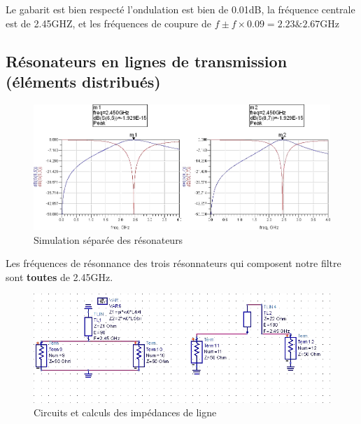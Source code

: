 \documentclass[10pt]{article}
\begin{document}
Le gabarit est bien respecté l’ondulation est bien de 0.01dB, la fréquence centrale est de 2.45GHZ,
et les fréquences de coupure de $f\pm f\times 0.09= 2.23 \& 2.67$GHz

\subsection{Résonateurs en lignes de transmission (éléments distribués)}

\begin{figure}
    \begin{center}
        \includegraphics[width=15cm]{p17_simu_resonateur}
    \end{center}
    \caption{Simulation séparée des résonateurs}
\end{figure}

Les fréquences de résonnance des trois résonnateurs qui composent notre filtre sont \textbf{toutes} de 2.45GHz.

\begin{figure}
    \begin{center}
        \includegraphics{p18_circuit}
    \end{center}
    \caption{Circuits et calculs des impédances de ligne}
\end{figure}
\end{document}
